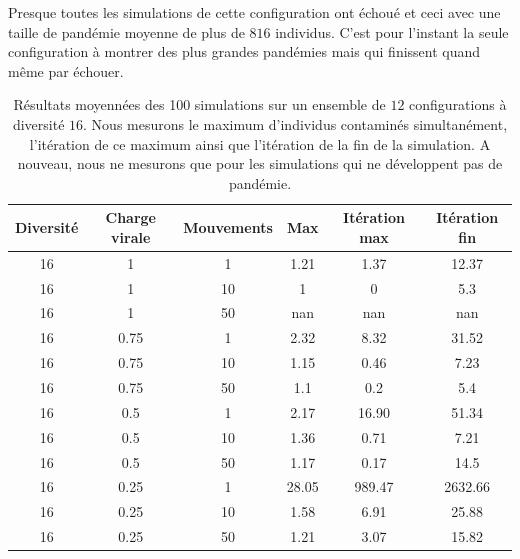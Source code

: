 Presque toutes les simulations de cette configuration ont échoué et ceci avec une taille de pandémie moyenne de plus de $816$ individus. C'est pour l'instant la seule configuration à montrer des plus grandes pandémies mais qui finissent quand même par échouer.

\begin{table}[H]
	\centering
	\renewcommand{\arraystretch}{0.6}
	\captionsetup{justification=centering}
	\caption[Statistiques : diversité 16]{Résultats moyennées des 100 simulations sur un ensemble de $12$ configurations à diversité $16$. Nous mesurons le maximum d'individus contaminés simultanément, l'itération de ce maximum ainsi que l'itération de la fin de la simulation. A nouveau, nous ne mesurons que pour les simulations qui ne développent pas de pandémie.\label{tab:grid}}
	\vspace{0.1cm}
	\begin{tabular}{@{\extracolsep{\fill} } |c| c| c| c| c| c|}
		\toprule
		Diversité & Charge virale & Mouvements & Max   & Itération max & Itération fin \\
		\midrule
		16        & 1             & 1          & 1.21  & 1.37          & 12.37         \\
		\midrule
		16        & 1             & 10         & 1     & 0             & 5.3           \\
		\midrule
		16        & 1             & 50         & nan   & nan           & nan           \\
		\midrule
		16        & 0.75          & 1          & 2.32  & 8.32          & 31.52         \\
		\midrule
		16        & 0.75          & 10         & 1.15  & 0.46          & 7.23          \\
		\midrule
		16        & 0.75          & 50         & 1.1   & 0.2           & 5.4           \\
		\midrule
		16        & 0.5           & 1          & 2.17  & 16.90         & 51.34         \\
		\midrule
		16        & 0.5           & 10         & 1.36  & 0.71          & 7.21          \\
		\midrule
		16        & 0.5           & 50         & 1.17  & 0.17          & 14.5          \\
		\midrule
		16        & 0.25          & 1          & 28.05 & 989.47        & 2632.66       \\
		\midrule
		16        & 0.25          & 10         & 1.58  & 6.91          & 25.88         \\
		\midrule
		16        & 0.25          & 50         & 1.21  & 3.07          & 15.82         \\
		\bottomrule
	\end{tabular}
\end{table}

